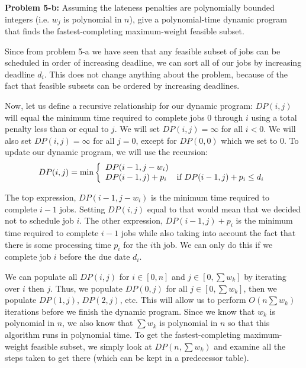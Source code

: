 \documentclass[psamsfonts]{amsart}
\newenvironment{sol}{\vspace{0.25cm}{\large \bfseries Solution:}}{\qedsymbol}
\newenvironment{prob}[1]{\begin{framed}{\large \bfseries Problem #1:}}{\end{framed}}
\begin{document}
\begin{prob}{5-b}
Assuming the lateness penalties are polynomially bounded integers (i.e. $w_j$ is polynomial in $n$), give a polynomial-time dynamic program that finds the fastest-completing maximum-weight feasible subset. 
\end{prob}
\begin{sol}
Since from problem 5-a we have seen that any feasible subset of jobs can be scheduled in order of increasing deadline, we can sort all of our jobs by increasing deadline $d_i$. This does not change anything about the problem, because of the fact that feasible subsets can be ordered by increasing deadlines. 

Now, let us define a recursive relationship for our dynamic program: $DP(i,j)$ will equal the minimum time required to complete jobs $0$ through $i$ using a total penalty less than or equal to $j$. We will set $DP(i, j) = \infty$ for all $i < 0$. We will also set $DP(i,j) = \infty$ for all $j = 0$, except for $DP(0,0)$ which we set to 0. To update our dynamic program, we will use the recursion:
\begin{eqnarray}
DP(i,j) = \min \left\{ \begin{array}{l l}
DP(i-1, j - w_i) & \\
DP(i-1, j) + p_i & \text{if } DP(i-1, j) + p_i \leq d_i
\end{array} \right. 
\end{eqnarray}

The top expression, $DP(i-1, j- w_i)$ is the minimum time required to complete $i-1$ jobs. Setting $DP(i,j)$ equal to that would mean that we decided not to schedule job $i$. The other expression, $DP(i-1, j) + p_i$ is the minimum time required to complete $i-1$ jobs while also taking into account the fact that there is some processing time $p_i$ for the $i$th job. We can only do this if we complete job $i$ before the due date $d_i$. 

We can populate all $DP(i,j)$ for $i \in [0,n]$ and $j \in [0, \sum w_k]$ by iterating over $i$ then $j$. Thus, we populate $DP(0, j)$ for all $j \in [0, \sum w_k]$, then we populate $DP(1, j)$, $DP(2, j)$, etc. This will allow us to perform $O(n \sum w_k)$ iterations before we finish the dynamic program. Since we know that $w_k$ is polynomial in $n$, we also know that $\sum w_k$ is polynomial in $n$ so that this algorithm runs in polynomial time. To get the fastest-completing maximum-weight feasible subset, we simply look at $DP(n, \sum w_k)$ and examine all the steps taken to get there (which can be kept in a predecessor table).
\end{sol}
\end{document}
